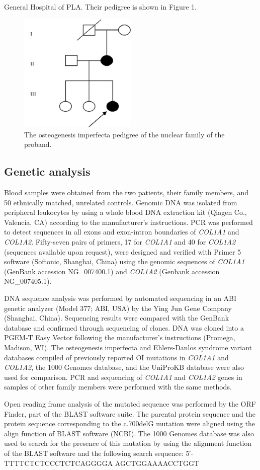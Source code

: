 General Hospital of PLA. Their pedigree is shown in Figure 1. \begin{figure}[!h] \centering \includegraphics[width=0.5\textwidth]{1415-4757-gmb-38-1-1-gf01.png} \caption{The osteogenesis imperfecta pedigree of the nuclear family of the proband.} \label{Figure 1} \end{figure} \subsection*{Genetic analysis}\par Blood samples were obtained from the two patients, their family members, and 50 ethnically matched, unrelated controls. Genomic DNA was isolated from peripheral leukocytes by using a whole blood DNA extraction kit (Qiagen Co., Valencia, CA) according to the manufacturer’s instructions. PCR was performed to detect sequences in all exons and exon-intron boundaries of \textit{COL1A1} and \textit{COL1A2}. Fifty-seven pairs of primers, 17 for \textit{COL1A1} and 40 for \textit{COL1A2} (sequences available upon request), were designed and verified with Primer 5 software (Softonic, Shanghai, China) using the genomic sequences of \textit{COL1A1} (GenBank accession NG\_007400.1) and \textit{COL1A2} (Genbank accession NG\_007405.1).\par DNA sequence analysis was performed by automated sequencing in an ABI genetic analyzer (Model 377; ABI, USA) by the Ying Jun Gene Company (Shanghai, China). Sequencing results were compared with the GenBank database and confirmed through sequencing of clones. DNA was cloned into a PGEM-T Easy Vector following the manufacturer’s instructions (Promega, Madison, WI). The osteogenesis imperfecta and Ehlers-Danlos syndrome variant databases compiled of previously reported OI mutations in \textit{COL1A1} and \textit{COL1A2}, the 1000 Genomes database, and the UniProKB database were also used for comparison. PCR and sequencing of \textit{COL1A1} and \textit{COL1A2} genes in samples of other family members were performed with the same methods.\par Open reading frame analysis of the mutated sequence was performed by the ORF Finder, part of the BLAST software suite. The parental protein sequence and the protein sequence corresponding to the c.700delG mutation were aligned using the align function of BLAST software (NCBI). The 1000 Genomes database was also used to search for the presence of this mutation by using the alignment function of the BLAST software and the following search sequence: 5′-TTTTCTCTCCCTCTCAGGGGA AGCTGGAAAACCTGGT 